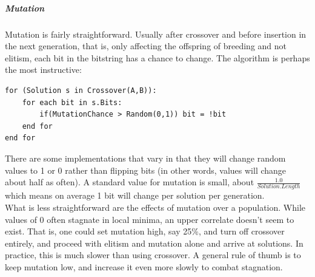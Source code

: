 \subparagraph{Mutation}
Mutation is fairly straightforward.  Usually after crossover and before insertion in the next generation, that is, only affecting the offspring of breeding and not elitism, each bit in the bitstring has a chance to change.  The algorithm is perhaps the most instructive: \begin{lstlisting}[language=algorithm, caption={Mutation}, label={fig:mutation}]
for (Solution s in Crossover(A,B)):
	for each bit in s.Bits:
		if(MutationChance > Random(0,1)) bit = !bit
	end for
end for
\end{lstlisting}
There are some implementations that vary in that they will change random values to 1 or 0 rather than flipping bits (in other words, values will change about half as often).  A standard value for mutation is small, about 
${\frac{1.0}{Solution.Length}}$ which means on average 1 bit will change per solution per generation.\\
What is less straightforward are the effects of mutation over a population.  While values of 0 often stagnate in local minima, an upper correlate doesn't seem to exist.  That is, one could set mutation high, say 25\%, and turn off crossover entirely, and proceed with elitism and mutation alone and arrive at solutions.  In practice, this is much slower than using crossover. A general rule of thumb is to keep mutation low, and increase it even more slowly to combat stagnation.\\
